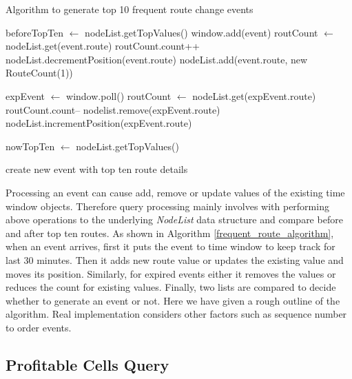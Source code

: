 \begin{algorithm}
\caption{Algorithm to generate top 10 frequent route change events}
\label{frequent_route_algorithm}
\begin{algorithmic}
\small 
\STATE beforeTopTen $\leftarrow$ nodeList.getTopValues() 
\STATE window.add(event) 
	\STATE routCount $\leftarrow$ nodeList.get(event.route) 
	\STATE routCount.count++ 
	\STATE nodeList.decrementPosition(event.route) 
\ELSE
	\STATE nodeList.add(event.route, new RouteCount(1)) 
\ENDIF

	\STATE  expEvent $\leftarrow$ window.poll() 
	\STATE  routCount $\leftarrow$ nodeList.get(expEvent.route)
	\STATE  routCount.count-- 
		\STATE nodelist.remove(expEvent.route)
	\ELSE
		\STATE nodeList.incrementPosition(expEvent.route) 
	\ENDIF
\ENDWHILE

\STATE nowTopTen $\leftarrow$ nodeList.getTopValues() 

	\STATE create new event with top ten route details 
\ENDIF

\end{algorithmic}
\end{algorithm}

Processing an event can cause add, remove or update values of the existing time window objects. Therefore query processing mainly involves with performing above operations to the underlying \textit{NodeList} data structure and compare before and after top ten routes. As shown in Algorithm \ref{frequent_route_algorithm}, when an event arrives, first it puts the event to time window to keep track for last 30 minutes. Then it adds new route value or updates the existing value and moves its position. Similarly, for expired events either it removes the values or reduces the count for existing values. Finally, two lists are compared to decide whether to generate an event or not. Here we have given a rough outline of the algorithm. Real implementation considers other factors such as sequence number to order events.

\subsection{Profitable Cells Query}

